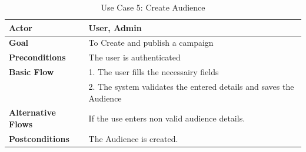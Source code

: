 \begin{table}[ht]
	\centering
	\begin{tabularx}{\textwidth}{|l|X|}
		\hline
		\textbf{Actor}             & User, Admin                                                        \\
		\hline
		\textbf{Goal}              & To Create and publish a campaign                                   \\
		\hline
		\textbf{Preconditions}     & The user is authenticated                                          \\
		\hline
		\textbf{Basic Flow}        & 1. The user fills the necessairy fields                            \\
		                           & 2. The system validates the entered details and saves the Audience \\
		\hline
		\textbf{Alternative Flows} & If the use enters non valid audience details.                      \\
		\hline
		\textbf{Postconditions}    & The Audience is created.                                           \\
		\hline
	\end{tabularx}
	\caption{Use Case 5: Create Audience}
	\label{tab:Use Case 5 Create Audience}
\end{table}

\clearpage